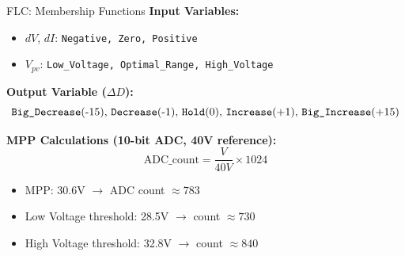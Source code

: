 \documentclass[aspectratio=169,usenames,dvipsnames]{beamer}
\begin{document}
\begin{frame}{FLC: Membership Functions}
    \textbf{Input Variables:}
    \begin{itemize}
        \item $dV$, $dI$: \texttt{Negative, Zero, Positive}
        \item $V_{pv}$: \texttt{Low\_Voltage, Optimal\_Range, High\_Voltage}
    \end{itemize}
    
    \vspace{0.2cm}
    \textbf{Output Variable ($\Delta D$):}
    \[\text{\texttt{Big\_Decrease}(-15), \texttt{Decrease}(-1), \texttt{Hold}(0), \texttt{Increase}(+1), \texttt{Big\_Increase}(+15)}\]
    
    \vspace{0.3cm}
    \textbf{MPP Calculations (10-bit ADC, 40V reference):}
    \[\text{ADC\_count} = \frac{V}{40V} \times 1024\]
    
    \begin{itemize}
        \item MPP: 30.6V $\rightarrow$ ADC count $\approx 783$
        \item Low Voltage threshold: 28.5V $\rightarrow$ count $\approx 730$
        \item High Voltage threshold: 32.8V $\rightarrow$ count $\approx 840$
    \end{itemize}
\end{frame}
\end{document}
